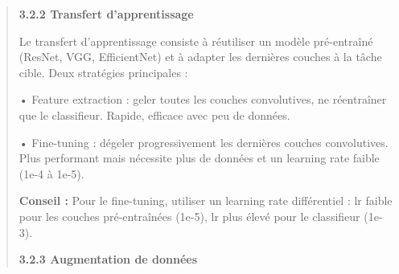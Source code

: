 \documentclass[
]{article}
\begin{document}
\begin{quote}
\textbf{3.2.2 Transfert d'apprentissage}

Le transfert d'apprentissage consiste à réutiliser un modèle
pré-entraîné (ResNet, VGG, EfficientNet) et à adapter les dernières
couches à la tâche cible. Deux stratégies principales :

• Feature extraction : geler toutes les couches convolutives, ne
réentraîner que le classifieur. Rapide, efficace avec peu de données.

• Fine-tuning : dégeler progressivement les dernières couches
convolutives. Plus performant mais nécessite plus de données et un
learning rate faible (1e-4 à 1e-5).

\textbf{Conseil :} Pour le fine-tuning, utiliser un learning rate
différentiel : lr faible pour les couches pré-entraînées (1e-5), lr plus
élevé pour le classifieur (1e-3).

\textbf{3.2.3 Augmentation de données}
\end{quote}
\end{document}
